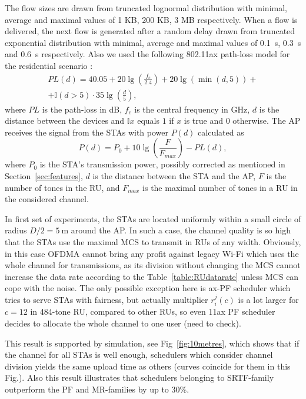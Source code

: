 The flow sizes are drawn from truncated lognormal distribution with minimal, average and maximal values of 1 KB, 200 KB, 3 MB respectively. 
When a flow is delivered, the next flow is generated after a random delay drawn from truncated exponential distribution with minimal, average and maximal values of \SI{0.1}{\s}, \SI{0.3}{\s} and \SI{0.6}{\s} respectively.
Also we used the following 802.11ax path-loss model for the residential scenario \cite{presentation_scenarios}:
\begin{multline*}
PL(d) = 40.05 + 20 \lg\left(\frac{f_c}{2.4}\right) + 20 \lg(\min(d, 5)) + \\
+ \mathbb{I}(d > 5) \cdot 35 \lg\left(\frac{d}{5}\right),
\end{multline*}
where $PL$ is the path-loss in dB, $f_c$ is the central frequency in GHz, $d$ is the distance between the devices and $\mathbb{I}{x}$ equals $1$ if $x$ is true and $0$ otherwise.
The AP receives the signal from the STAs with power $P(d)$ calculated as
$$
P(d) = P_0 + 10 \lg\left(\frac{F}{F_{max}}\right) - PL(d),
$$
where $P_0$ is the STA's transmission power, possibly corrected as mentioned in Section~\ref{sec:features}, $d$ is the distance between the STA and the AP, $F$ is the number of tones in the RU, and $F_{max}$ is the maximal number of tones in a RU in the considered channel.


In first set of experiments, the STAs are located uniformly within a small circle of radius $D/2 = \SI{5}{\m}$ around the AP.
In such a case, the channel quality is so high that the STAs use the maximal MCS to transmit in RUs of any width.
Obviously, in this case OFDMA cannot bring any profit against legacy Wi-Fi which uses the whole channel for transmissions, as its division without changing the MCS cannot increase the data rate according to the Table~\ref{table:RUdatarate} unless MCS  can cope with the noise. The only possible exception here is ax-PF scheduler which tries to serve STAs with fairness, but actually multiplier $r^j_i (c)$ is a lot larger for $c=12$ in 484-tone RU, compared to other RUs, so even 11ax PF scheduler decides to allocate the whole channel to one user (need to check).

This result is supported by simulation, see Fig~\ref{fig:10metres}, which shows that if the channel for all STAs is well enough, schedulers which consider channel division yields the same upload time as others (curves coincide for them in this Fig.). Also this result illustrates that schedulers belonging to SRTF-family outperform the PF and MR-families by up to 30\%. 

